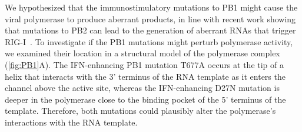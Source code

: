 \documentclass[lineno]{asm-article}
\newcommand{\FIG}[1]{\autoref{fig:#1}}
\begin{document}
We hypothesized that the immunostimulatory mutations to PB1 might cause the viral polymerase to produce aberrant products, in line with recent work showing that mutations to PB2 can lead to the generation of aberrant RNAs that trigger RIG-I~\cite{velthuis2018mini, du2018genome}.
To investigate if the PB1 mutations might perturb polymerase activity, we examined their location in a structural model of the polymerase complex (\FIG{PB1}A).
The IFN-enhancing PB1 mutation T677A occurs at the tip of a helix that interacts with the 3' terminus of the RNA template as it enters the channel above the active site, whereas the IFN-enhancing D27N mutation is deeper in the polymerase close to the binding pocket of the 5' terminus of the template. 
Therefore, both mutations could plausibly alter the polymerase's interactions with the RNA template.
\end{document}
